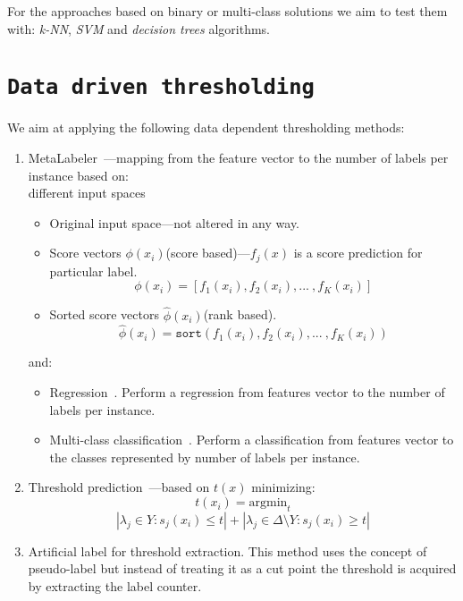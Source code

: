 \documentclass[12pt,a4paper,twocolumn]{article}
\newcommand{\ts}{\textsuperscript}
\begin{document}
For the approaches based on binary or multi-class solutions we aim to test them with: \emph{k-NN}, \emph{SVM} and \emph{decision trees} algorithms.

\section*{\texttt{Data driven thresholding}}
We aim at applying the following data dependent thresholding methods:


\begin{enumerate}
\item MetaLabeler~\cite{Tang:2009:LSM:1526709.1526738}---mapping from the feature vector to the number of labels per instance based on:\\

	different input spaces
	\begin{itemize} %
	\item Original input space---not altered in any way.
	\item Score vectors $\phi(x_i)$(score based)---$f_j(x)$ is a score prediction for particular label.
	$$
	\phi(x_i) = [ f_1(x_i), f_2(x_i), ...\ , f_K(x_i) ]
	$$
	\item Sorted score vectors $\hat{\phi}(x_i)$(rank based).
	$$
	\hat{\phi}(x_i) = \texttt{sort} ( f_1(x_i), f_2(x_i), ...\ , f_K(x_i) )
	$$
	\end{itemize}

	and:
	\begin{itemize} %
	\item Regression~\cite{conf/ictai/IoannouSTV10}. Perform a regression from features vector to the number of labels per instance.
	\item Multi-class classification~\cite{conf/ictai/IoannouSTV10}. Perform a classification from features vector to the classes represented by number of labels per instance.
	\end{itemize}

\item Threshold prediction~\cite{Elisseeff01akernel}---based on $t(x)$ minimizing:
	$$
	t(x_i) = \text{argmin}_t $$ $$ | \lambda_j \in Y : s_j(x_i) \leq t | + | \lambda_j \in \Delta \text{\textbackslash{}} Y : s_j(x_i) \geq t |
	$$

\item Artificial label for threshold extraction. This method uses the concept of pseudo-label but instead of treating it as a cut point the threshold is acquired by extracting the label counter.%


\end{enumerate}
\end{document}
